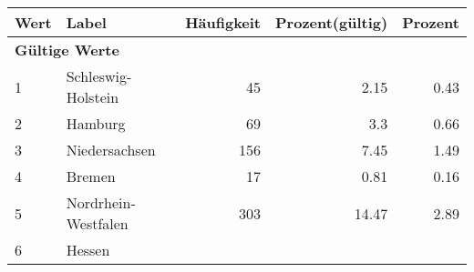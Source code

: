      \begin{longtable}{lXrrr}
     \toprule
     \textbf{Wert} & \textbf{Label} & \textbf{Häufigkeit} & \textbf{Prozent(gültig)} & \textbf{Prozent} \\
     \endhead
     \midrule
     \multicolumn{5}{l}{\textbf{Gültige Werte}}\\

     1 &
     \multicolumn{1}{X}{ Schleswig-Holstein   } &


       \num{45} &
       \num[round-mode=places,round-precision=2]{2.15} &
         \num[round-mode=places,round-precision=2]{0.43} \\

     2 &
     \multicolumn{1}{X}{ Hamburg   } &


       \num{69} &
       \num[round-mode=places,round-precision=2]{3.3} &
         \num[round-mode=places,round-precision=2]{0.66} \\

     3 &
     \multicolumn{1}{X}{ Niedersachsen   } &


       \num{156} &
       \num[round-mode=places,round-precision=2]{7.45} &
         \num[round-mode=places,round-precision=2]{1.49} \\

     4 &
     \multicolumn{1}{X}{ Bremen   } &


       \num{17} &
       \num[round-mode=places,round-precision=2]{0.81} &
         \num[round-mode=places,round-precision=2]{0.16} \\

     5 &
     \multicolumn{1}{X}{ Nordrhein-Westfalen   } &


       \num{303} &
       \num[round-mode=places,round-precision=2]{14.47} &
         \num[round-mode=places,round-precision=2]{2.89} \\

     6 &
     \multicolumn{1}{X}{ Hessen   } &



\end{longtable}
